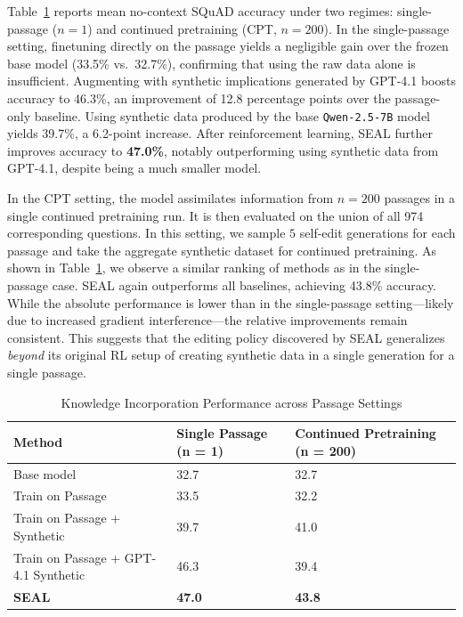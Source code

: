 \documentclass{article}
\newcommand{\methodacronym}{SEAL\xspace}
\begin{document}
Table~\ref{tab:merged_knowledge_incorp} reports mean no-context SQuAD accuracy under two regimes: single-passage ($n = 1$) and continued pretraining (CPT, $n = 200$). In the single-passage setting, finetuning directly on the passage yields a negligible gain over the frozen base model (33.5\% vs.\ 32.7\%), confirming that using the raw data alone is insufficient. Augmenting with synthetic implications generated by GPT-4.1 boosts accuracy to 46.3\%, an improvement of 12.8 percentage points over the passage-only baseline. Using synthetic data produced by the base \texttt{Qwen-2.5-7B} model yields 39.7\%, a 6.2-point increase. After reinforcement learning, \methodacronym{} further improves accuracy to \textbf{47.0\%}, notably outperforming using synthetic data from GPT-4.1, despite being a much smaller model.

In the CPT setting, the model assimilates information from $n = 200$ passages in a single continued pretraining run. It is then evaluated on the union of all 974 corresponding questions. In this setting, we sample $5$ self-edit generations for each passage and take the aggregate synthetic dataset for continued pretraining. As shown in Table~\ref{tab:merged_knowledge_incorp}, we observe a similar ranking of methods as in the single-passage case. \methodacronym{} again outperforms all baselines, achieving 43.8\% accuracy. While the absolute performance is lower than in the single-passage setting---likely due to increased gradient interference---the relative improvements remain consistent. This suggests that the editing policy discovered by \methodacronym generalizes \textit{beyond} its original RL setup of creating synthetic data in a single generation for a single passage.

\begin{table}[ht]
    \centering
    \footnotesize
    \label{tab:merged_knowledge_incorp}
    \begin{tabular}{l p{2.2cm} p{3.2cm}}
        \toprule
        \textbf{Method} & \textbf{Single Passage (n = 1)} & \textbf{Continued Pretraining (n = 200)} \\ \midrule
        Base model & 32.7 & 32.7 \\
        Train on Passage & 33.5 & 32.2 \\
        Train on Passage + Synthetic & 39.7 & 41.0 \\
        Train on Passage + GPT-4.1 Synthetic & 46.3 & 39.4 \\
        \textbf{\methodacronym} & \textbf{47.0} & \textbf{43.8} \\
        \bottomrule
    \end{tabular}
    \vspace{6pt}
    \caption{Knowledge Incorporation Performance across Passage Settings}
    \vspace{-8pt}
\end{table}
\end{document}

